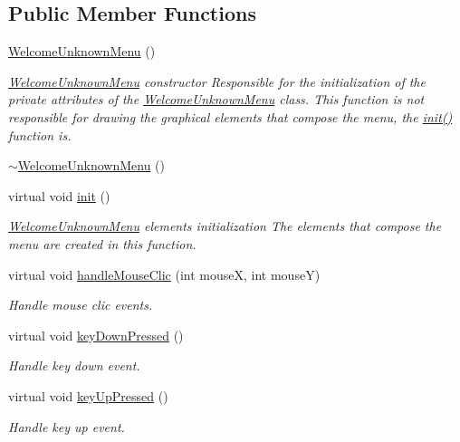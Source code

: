 \subsection*{Public Member Functions}
\begin{DoxyCompactItemize}
\item 
\hyperlink{class_symp_1_1_welcome_unknown_menu_a7510d4b914b2ffa4140a4f26c423e382}{Welcome\-Unknown\-Menu} ()
\begin{DoxyCompactList}\small\item\em \hyperlink{class_symp_1_1_welcome_unknown_menu}{Welcome\-Unknown\-Menu} constructor Responsible for the initialization of the private attributes of the \hyperlink{class_symp_1_1_welcome_unknown_menu_a7510d4b914b2ffa4140a4f26c423e382}{Welcome\-Unknown\-Menu} class. This function is not responsible for drawing the graphical elements that compose the menu, the \hyperlink{class_symp_1_1_welcome_unknown_menu_a57182187076a7158a71ad395bfdc1202}{init()} function is. \end{DoxyCompactList}\item 
\hyperlink{class_symp_1_1_welcome_unknown_menu_a2df66f757fe7a5bbad3c3bdd3d5f43ad}{$\sim$\-Welcome\-Unknown\-Menu} ()
\item 
virtual void \hyperlink{class_symp_1_1_welcome_unknown_menu_a57182187076a7158a71ad395bfdc1202}{init} ()
\begin{DoxyCompactList}\small\item\em \hyperlink{class_symp_1_1_welcome_unknown_menu}{Welcome\-Unknown\-Menu} elements initialization The elements that compose the menu are created in this function. \end{DoxyCompactList}\item 
virtual void \hyperlink{class_symp_1_1_welcome_unknown_menu_aab730d45332061d9028802a34bf307a4}{handle\-Mouse\-Clic} (int mouse\-X, int mouse\-Y)
\begin{DoxyCompactList}\small\item\em Handle mouse clic events. \end{DoxyCompactList}\item 
virtual void \hyperlink{class_symp_1_1_welcome_unknown_menu_a6d4dcd79840d2ae8b0ad17759c3ffdac}{key\-Down\-Pressed} ()
\begin{DoxyCompactList}\small\item\em Handle key down event. \end{DoxyCompactList}\item 
virtual void \hyperlink{class_symp_1_1_welcome_unknown_menu_a2fcfb802e8398d1a5178b904841650fb}{key\-Up\-Pressed} ()
\begin{DoxyCompactList}\small\item\em Handle key up event. \end{DoxyCompactList}\end{DoxyCompactItemize}


